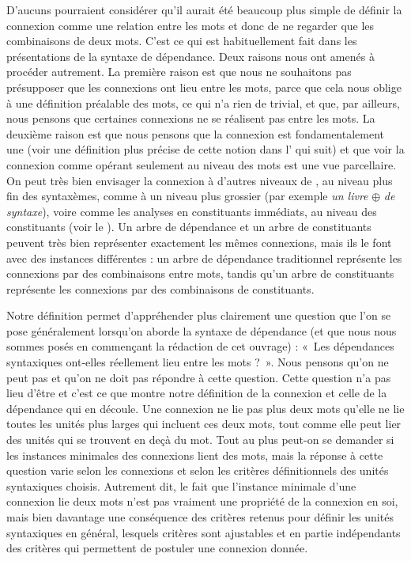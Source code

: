 D’aucuns pourraient considérer qu’il aurait été beaucoup plus simple de définir la connexion comme une relation entre les mots et donc de ne regarder que les combinaisons de deux mots. C’est ce qui est habituellement fait dans les présentations de la syntaxe de dépendance. Deux raisons nous ont amenés à procéder autrement. La première raison est que nous ne souhaitons pas présupposer que les connexions ont lieu entre les mots, parce que cela nous oblige à une définition préalable des mots, ce qui n’a rien de trivial, et que, par ailleurs, nous pensons que certaines connexions ne se réalisent pas entre les mots. La deuxième raison est que nous pensons que la connexion est fondamentalement une   (voir une définition plus précise de cette notion dans l’ qui suit) et que voir la connexion comme opérant seulement au niveau des mots est une vue parcellaire. On peut très bien envisager la connexion à d’autres niveaux de , au niveau plus fin des syntaxèmes, comme à un niveau plus grossier (par exemple \textit{un livre} ${\oplus}$ \textit{de syntaxe}), voire comme les analyses en constituants immédiats, au niveau des constituants (voir le ). Un arbre de dépendance et un arbre de constituants peuvent très bien représenter exactement les mêmes connexions, mais ils le font avec des instances différentes : un arbre de dépendance traditionnel représente les connexions par des combinaisons entre mots, tandis qu’un arbre de constituants représente les connexions par des combinaisons de constituants.%

Notre définition permet d’appréhender plus clairement une question que l’on se pose généralement lorsqu’on aborde la syntaxe de dépendance (et que nous nous sommes posés en commençant la rédaction de cet ouvrage) : «~Les dépendances syntaxiques ont-elles réellement lieu entre les mots ?~». Nous pensons qu’on ne peut pas et qu’on ne doit pas répondre à cette question. Cette question n’a pas lieu d’être et c’est ce que montre notre définition de la connexion et celle de la dépendance qui en découle. Une connexion ne lie pas plus deux mots qu’elle ne lie toutes les unités plus larges qui incluent ces deux mots, tout comme elle peut lier des unités qui se trouvent en deçà du mot. Tout au plus peut-on se demander si les instances minimales des connexions lient des mots, mais la réponse à cette question varie selon les connexions et selon les critères définitionnels des unités syntaxiques choisis. Autrement dit, le fait que l’instance minimale d’une connexion lie deux mots n’est pas vraiment une propriété de la connexion en soi, mais bien davantage une conséquence des critères retenus pour définir les unités syntaxiques en général, lesquels critères sont ajustables et en partie indépendants des critères qui permettent de postuler une connexion donnée.%


